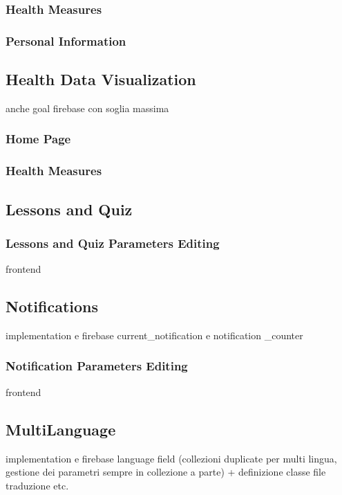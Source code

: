 \subsubsection{Health Measures}
\subsubsection{Personal Information}

\subsection{Health Data Visualization}
anche goal firebase con soglia massima
\subsubsection{Home Page}
\subsubsection{Health Measures}

\subsection{Lessons and Quiz}
\subsubsection{Lessons and Quiz Parameters Editing}
frontend

\subsection{Notifications}
\label{subsec:notifications}

implementation e firebase current\_notification e notification \_counter
\subsubsection{Notification Parameters Editing}
frontend 

\subsection{MultiLanguage}
implementation e firebase language field
(collezioni duplicate per multi lingua, gestione dei parametri sempre in collezione a parte) + definizione classe file traduzione etc.
